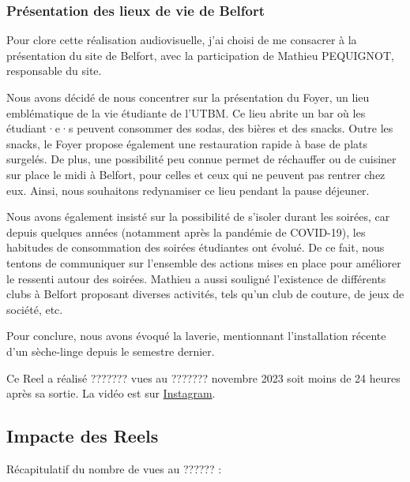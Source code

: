 \subsubsection{Présentation des lieux de vie de Belfort}

Pour clore cette réalisation audiovisuelle, j'ai choisi de me consacrer à la présentation du site de Belfort, avec la participation de Mathieu PEQUIGNOT, responsable du site.

Nous avons décidé de nous concentrer sur la présentation du Foyer, un lieu emblématique de la vie étudiante de l'\gls{UTBM}.
Ce lieu abrite un bar où les étudiant·e·s peuvent consommer des sodas, des bières et des snacks.
Outre les snacks, le Foyer propose également une restauration rapide à base de plats surgelés.
De plus, une possibilité peu connue permet de réchauffer ou de cuisiner sur place le midi à Belfort, pour celles et ceux qui ne peuvent pas rentrer chez eux.
Ainsi, nous souhaitons redynamiser ce lieu pendant la pause déjeuner.

Nous avons également insisté sur la possibilité de s'isoler durant les soirées, car depuis quelques années (notamment après la pandémie de COVID-19), les habitudes de consommation des soirées étudiantes ont évolué.
De ce fait, nous tentons de communiquer sur l'ensemble des actions mises en place pour améliorer le ressenti autour des soirées.
Mathieu a aussi souligné l'existence de différents clubs à Belfort proposant diverses activités, tels qu'un club de couture, de jeux de société, etc.

Pour conclure, nous avons évoqué la laverie, mentionnant l'installation récente d'un sèche-linge depuis le semestre dernier.

Ce Reel a réalisé ??????? vues au ??????? novembre 2023 soit moins de 24 heures après sa sortie.
La vidéo est sur \href{https://www.instagram.com/reel/CzjfX8Xs5X1/?utm_source=ig_web_copy_link&igshid=MzRlODBiNWFlZA==}{Instagram}.


\subsection{Impacte des Reels}\label{subsec:impacte-des-reels}


Récapitulatif du nombre de vues au ?????? :

